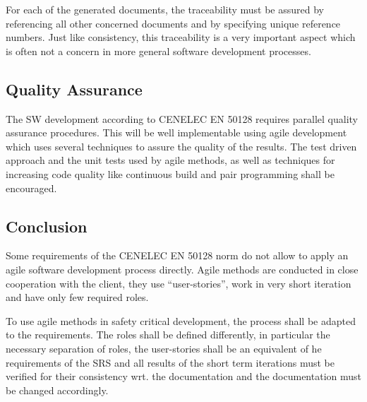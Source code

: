 For each of the generated documents, the traceability must be assured by
referencing all other concerned documents and by specifying unique reference
numbers. Just like consistency, this traceability is a very important aspect
which is often not a concern in more general software development processes.


\subsection{Quality Assurance}
\label{sec:quality-assurance}

The SW development according to CENELEC EN 50128 requires parallel quality
assurance procedures. This will be well implementable using agile development
which uses several techniques to assure the quality of the results. The test
driven approach and the unit tests used by agile methods, as well as techniques
for increasing code quality like continuous build and pair programming shall be
encouraged.

\subsection{Conclusion}
\label{sec:conclusion}

Some requirements of the CENELEC EN 50128 norm do not allow to apply an agile
software development process directly. Agile methods are conducted in close
cooperation with the client, they use ``user-stories'', work in very short
iteration and have only few required roles.

To use agile methods in safety critical development, the  process shall be
adapted to the requirements. The roles shall be defined differently, in
particular the necessary separation of roles, the user-stories shall be an
equivalent of he requirements of the SRS and all results of the short term
iterations must be verified for their consistency wrt. the documentation and the
documentation must be changed accordingly.





